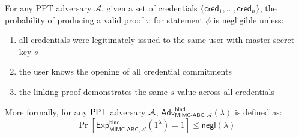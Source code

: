 \newpage
\begin{definition}
For any PPT adversary $\mathcal{A}$, given a set of credentials $\{\mathsf{cred}_1,...,\mathsf{cred}_n\}$, the probability of producing a valid proof $\pi$ for statement $\phi$ is negligible unless:

\begin{enumerate}
    \item all credentials were legitimately issued to the same user with master secret key $s$
    \item the user knows the opening of all credential commitments
    \item the linking proof demonstrates the same $s$ value across all credentials
\end{enumerate}

\noindent More formally, for any $\mathsf{PPT}$ adversary $\mathcal{A}$, $\mathsf{Adv}^{\mathsf{bind}}_{\mathsf{MIMC\mbox{-}ABC},\mathcal{A}}(\lambda)$ is defined as:
\[ \Pr[\mathsf{Exp}^{\mathsf{bind}}_{\mathsf{MIMC\mbox{-}ABC},\mathcal{A}}(1^\lambda) = 1] \leq \mathsf{negl}(\lambda) \]
\end{definition}

